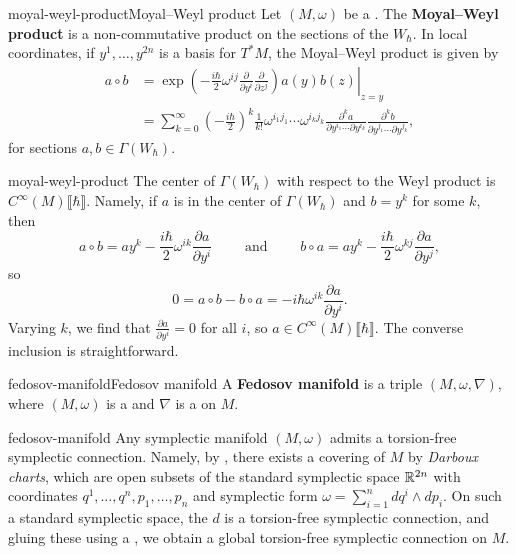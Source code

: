 \begin{topic}{moyal-weyl-product}{Moyal--Weyl product}
    Let $(M, \omega)$ be a . The \textbf{Moyal--Weyl product} is a non-commutative product on the sections of the  $W_\hbar$. In local coordinates, if $y^1, \ldots, y^{2n}$ is a basis for $T^*M$, the Moyal--Weyl product is given by
    \[ \begin{aligned}
        a \circ b
            &= \left. \exp \left(-\frac{i\hbar}{2} \omega^{ij} \frac{\partial}{\partial y^i} \frac{\partial}{\partial z^j}\right) a(y) b(z) \right|_{z = y} \\
            &= \sum_{k = 0}^{\infty} \left(-\frac{i\hbar}{2}\right)^k \frac{1}{k!} \omega^{i_1 j_1} \cdots \omega^{i_k j_k} \frac{\partial^k a}{\partial y^{i_1} \cdots \partial y^{i_k}} \frac{\partial^k b}{\partial y^{j_1} \cdots \partial y^{j_k}} ,
    \end{aligned} \]
    for sections $a, b \in \Gamma(W_\hbar)$.
\end{topic}

\begin{example}{moyal-weyl-product}
    The center of $\Gamma(W_\hbar)$ with respect to the Weyl product is $C^\infty(M)\llbracket \hbar \rrbracket$. Namely, if $a$ is in the center of $\Gamma(W_\hbar)$ and $b = y^k$ for some $k$, then
    \[ a \circ b = a y^k - \frac{i\hbar}{2} \omega^{ik} \frac{\partial a}{\partial y^i} \qquad \text{ and } \qquad b \circ a = a y^k - \frac{i\hbar}{2} \omega^{kj} \frac{\partial a}{\partial y^j} , \]
    so
    \[ 0 = a \circ b - b \circ a = - i \hbar \omega^{ik} \frac{\partial a}{\partial y^i} . \]
    Varying $k$, we find that $\frac{\partial a}{\partial y^i} = 0$ for all $i$, so $a \in C^\infty(M)\llbracket \hbar \rrbracket$. The converse inclusion is straightforward.
\end{example}

\begin{topic}{fedosov-manifold}{Fedosov manifold}
    A \textbf{Fedosov manifold} is a triple $(M, \omega, \nabla)$, where $(M, \omega)$ is a  and $\nabla$ is a   on $M$.
\end{topic}

\begin{example}{fedosov-manifold}
    Any symplectic manifold $(M, \omega)$ admits a torsion-free symplectic connection. Namely, by , there exists a covering of $M$ by \textit{Darboux charts}, which are open subsets of the standard symplectic space $\mathbb{R}^{2n}$ with coordinates $q^1, \ldots, q^n, p_1, \ldots, p_n$ and symplectic form $\omega = \sum_{i = 1}^{n} dq^i \wedge dp_i$. On such a standard symplectic space, the  $d$ is a torsion-free symplectic connection, and gluing these using a , we obtain a global torsion-free symplectic connection on $M$.
\end{example}
